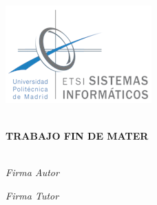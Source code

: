 \begin{titlepage}
\begin{center}

\begin{flushleft}
    \includegraphics[width=0.35\linewidth]{imgs/logo-etsisi.png}  \\[0.5 cm]
\end{flushleft}

\LARGE \MASTERNAME \\ [1 cm]

\LARGE \textbf{TRABAJO FIN DE MATER}\\[1 cm]

\Huge \textsc{\TFM} \\[1 cm]


\hfill \break
\hfill \break

\begin{multicols}{2}
\begin{flushleft}
\Large \emph{Firma Autor}
\end{flushleft}

\begin{flushright}
\Large \emph{Firma Tutor}
\end{flushright}

\end{multicols}

\vfill

\end{center}
\end{titlepage}